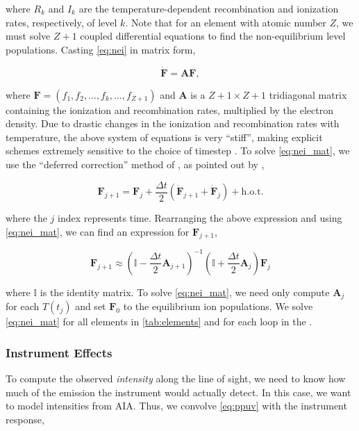 where $R_k$ and $I_k$ are the temperature-dependent recombination and ionization rates, respectively, of level $k$. Note that for an element with atomic number $Z$, we must solve $Z+1$ coupled differential equations to find the non-equilibrium level populations. Casting \autoref{eq:nei} in matrix form,

\begin{equation}\label{eq:nei_mat}
    \dot{\mathbf{F}} = \mathbf{A}\mathbf{F},
\end{equation}

where $\mathbf{F}=(f_1,f_2,\ldots,f_k,\ldots,f_{Z+1})$ and $\mathbf{A}$ is a ${Z+1\times Z+1}$ tridiagonal matrix containing the ionization and recombination rates, multiplied by the electron density. Due to drastic changes in the ionization and recombination rates with temperature, the above system of equations is very ``stiff'', making explicit schemes extremely sensitive to the choice of timestep \citep{macneice_numerical_1984,bradshaw_numerical_2009}. To solve \autoref{eq:nei_mat}, we use the ``deferred correction'' method of \citet{npl_modern_1961}, as pointed out by \citet{macneice_numerical_1984},

\begin{equation}
    \mathbf{F}_{j+1} = \mathbf{F}_j + \frac{\Delta t}{2}(\dot{\mathbf{F}}_{j+1} + \dot{\mathbf{F}}_j) + \mathrm{h.o.t.}
\end{equation}

where the $j$ index represents time. Rearranging the above expression and using \autoref{eq:nei_mat}, we can find an expression for $\mathbf{F}_{j+1}$,

\begin{equation}
    \mathbf{F}_{j+1} \approx \left(\mathbb{I} - \frac{\Delta t}{2}\mathbf{A}_{j+1}\right)^{-1}\left(\mathbb{I} + \frac{\Delta t}{2}\mathbf{A}_{j}\right)\mathbf{F}_j
\end{equation}

where $\mathbb{I}$ is the identity matrix. To solve \autoref{eq:nei_mat}, we need only compute $\mathbf{A}_j$ for each $T(t_j)$ and set $\mathbf{F}_0$ to the equilibrium ion populations. We solve \autoref{eq:nei_mat} for all elements in \autoref{tab:elements} and for each loop in the \AR.

\subsubsection{Instrument Effects}\label{instrument}

To compute the observed \textit{intensity} along the line of sight, we need to know how much of the emission the instrument would actually detect. In this case, we want to model intensities from AIA. Thus, we convolve \autoref{eq:ppuv} with the instrument response,

